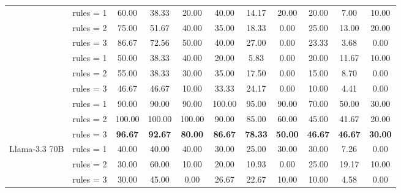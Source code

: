 \begin{table*}[t]
{\begin{tabular}{l c ccc ccc ccc}
           \hdashline
           \multirow{3}{*}{DeepSeek-V3} & rules = 1 & 60.00 & 38.33 & 20.00 & 40.00 & 14.17 & 20.00 & 20.00 & 7.00 & 10.00\\
           & rules = 2 & 75.00 & 51.67 & 40.00 & 35.00 & 18.33 & 0.00 & 25.00 & 13.00 & 20.00\\
           & \cellcolor{SeaGreen3!15}rules = 3 & \cellcolor{SeaGreen3!15}86.67 & \cellcolor{SeaGreen3!15}72.56 & \cellcolor{SeaGreen3!15}50.00 & \cellcolor{SeaGreen3!15}40.00 & \cellcolor{SeaGreen3!15}27.00 & \cellcolor{SeaGreen3!15}0.00 & \cellcolor{SeaGreen3!15}23.33 & \cellcolor{SeaGreen3!15}3.68 & \cellcolor{SeaGreen3!15}0.00\\
           \hdashline
           \multirow{3}{*}{o1-mini} & rules = 1 & 50.00 & 38.33 & 40.00 & 20.00 & 5.83 & 0.00 & 20.00 & 11.67 & 10.00\\
           & rules = 2 & 55.00 & 38.33 & 30.00 & 35.00 & 17.50 & 0.00 & 15.00 & 8.70 & 0.00\\
           & \cellcolor{SeaGreen3!15}rules = 3 & \cellcolor{SeaGreen3!15}46.67 & \cellcolor{SeaGreen3!15}46.67 & \cellcolor{SeaGreen3!15}10.00 & \cellcolor{SeaGreen3!15}33.33 & \cellcolor{SeaGreen3!15}24.17 & \cellcolor{SeaGreen3!15}0.00 & \cellcolor{SeaGreen3!15}10.00 & \cellcolor{SeaGreen3!15}4.41 & \cellcolor{SeaGreen3!15}0.00\\
           \hdashline
           \multirow{3}{*}{o3-mini} & rules = 1 & 90.00 & 90.00 & 90.00 & 100.00 & 95.00 & 90.00 & 70.00 & 50.00 & 30.00\\
           & rules = 2 & 100.00 & 100.00 & 100.00 & 90.00 & 85.00 & 60.00 & 45.00 & 41.67 & 20.00\\
           & \cellcolor{SeaGreen3!15}rules = 3 & \cellcolor{SeaGreen3!15}\textbf{96.67} & \cellcolor{SeaGreen3!15}\textbf{92.67} & \cellcolor{SeaGreen3!15}\textbf{80.00} & \cellcolor{SeaGreen3!15}\textbf{86.67} & \cellcolor{SeaGreen3!15}\textbf{78.33} & \cellcolor{SeaGreen3!15}\textbf{50.00} & \cellcolor{SeaGreen3!15}\textbf{46.67} & \cellcolor{SeaGreen3!15}\textbf{46.67} & \cellcolor{SeaGreen3!15}\textbf{30.00}\\
         \midrule
           \multirow{3}{*}{Llama-3.3 70B} & rules = 1 & 40.00 & 40.00 & 40.00 & 30.00 & 25.00 & 30.00 & 30.00 & 7.26 & 0.00\\
           & rules = 2 & 30.00 & 60.00 & 10.00 & 20.00 & 10.93 & 0.00 & 25.00 & 19.17 & 10.00\\
           & \cellcolor{SeaGreen3!30}rules = 3 & \cellcolor{SeaGreen3!30}30.00 & \cellcolor{SeaGreen3!30}45.00 & \cellcolor{SeaGreen3!30}0.00 & \cellcolor{SeaGreen3!30}26.67 & \cellcolor{SeaGreen3!30}22.67 & \cellcolor{SeaGreen3!30}10.00 & \cellcolor{SeaGreen3!30}10.00 & \cellcolor{SeaGreen3!30}4.58 & \cellcolor{SeaGreen3!30}0.00\\

\end{tabular}}
\end{table*}
